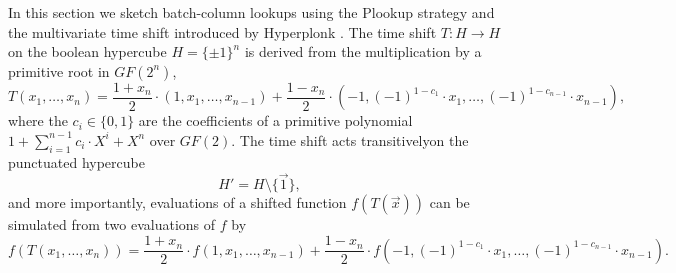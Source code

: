 \documentclass[11pt]{article}
\theoremstyle{definition}
\theoremstyle{definition}
\begin{document}
In this section we sketch batch-column lookups using the Plookup strategy and the multivariate time shift introduced by Hyperplonk \cite{Hyperplonk}. 
The time shift $T: H \rightarrow H$ on the boolean hypercube $H = \{\pm 1\}^n$ is derived from the multiplication by a primitive root in $GF(2^n)$, 
\[
T(x_1, \ldots, x_n) = \frac{1 + x_n}{2} \cdot (1, x_1,\ldots, x_{n-1}) + \frac{1 - x_n }{2} \cdot (- 1,(-1)^{1 - c_1}\cdot x_1,\ldots, (-1)^{1 - c_{n - 1}}\cdot x_{n-1}),
\]  
where the $c_i\in\{0,1\}$ are the coefficients of a primitive polynomial $1 + \sum_{i=1}^{n-1} c_i\cdot X^i + X^n$ over $GF(2)$.
The time shift acts transitively\footnotemark on the punctuated hypercube 
%
\[
H' = H\setminus\{\vec 1\},
\] 
and more importantly, evaluations of a shifted function $f(T(\vec x))$ can be simulated from two evaluations of $f$ by
\begin{equation*}
f(T(x_1, \ldots, x_n)) =  \frac{1 + x_n}{2} \cdot f(1, x_1,\ldots, x_{n-1}) + \frac{1 - x_n }{2} \cdot f(- 1,(-1)^{1 - c_1}\cdot x_1,\ldots, (-1)^{1 - c_{n - 1}}\cdot x_{n-1}).
\end{equation*}

\end{document}
